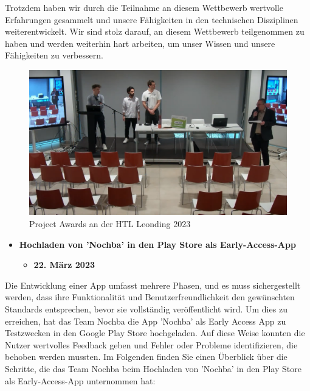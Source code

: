 Trotzdem haben wir durch die Teilnahme an diesem Wettbewerb wertvolle Erfahrungen gesammelt und unsere Fähigkeiten in den technischen Disziplinen weiterentwickelt. Wir sind stolz darauf, an diesem Wettbewerb teilgenommen zu haben und werden weiterhin hart arbeiten, um unser Wissen und unsere Fähigkeiten zu verbessern.

\begin{figure}[H]
    \centering
    \includegraphics[width=1\textwidth]{pics/ProjectAward.png}
    \caption{Project Awards an der HTL Leonding 2023}
    \label{fig:ProjectAward}
\end{figure}

\begin{itemize}
    \item \textbf{Hochladen von 'Nochba' in den Play Store als Early-Access-App}
          \begin{itemize}
              \item \textbf{22. März 2023}
          \end{itemize}
\end{itemize}

Die Entwicklung einer App umfasst mehrere Phasen, und es muss sichergestellt werden, dass ihre Funktionalität und Benutzerfreundlichkeit den gewünschten Standards entsprechen, bevor sie vollständig veröffentlicht wird. Um dies zu erreichen, hat das Team Nochba die App 'Nochba' als Early Access App zu Testzwecken in den Google Play Store hochgeladen. Auf diese Weise konnten die Nutzer wertvolles Feedback geben und Fehler oder Probleme identifizieren, die behoben werden mussten. Im Folgenden finden Sie einen Überblick über die Schritte, die das Team Nochba beim Hochladen von 'Nochba' in den Play Store als Early-Access-App unternommen hat:

